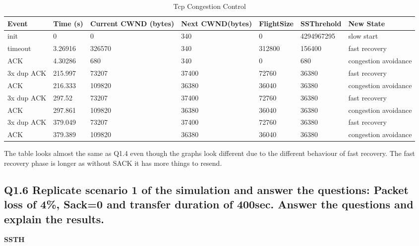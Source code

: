 \documentclass{article}
\begin{document}
\begin{table}[h]
\begin{tabular}{|l|l|l|l|l|l|l|}
\hline
Event           & Time (s)  & Current CWND (bytes) & Next CWND(bytes) & FlightSize & SSThrehold & New State  \\ \hline
init	& 0	        & 0             & 340	        & 0	        & 4294967295    & slow start \\ \hline
timeout	& 3.26916	& 326570	& 340	        & 312800        & 156400	& fast recovery \\ \hline
ACK	& 4.30286	& 680	        & 340	        & 0	        & 680	        & congestion avoidance \\ \hline
3x dup ACK	& 215.997	& 73207	        & 37400	        & 72760	        & 36380	        & fast recovery \\ \hline
ACK	& 216.333	& 109820	& 36380	        & 36040         & 36380	        & congestion avoidance \\ \hline
3x dup ACK& 297.52	& 73207	        & 37400	        & 72760	        & 36380         & fast recovery \\ \hline
ACK	& 297.861	& 109820	& 36380	        & 36040         & 36380	        & congestion avoidance \\ \hline
3x dup ACK	& 379.049	& 73207	        & 37400	        & 72760         & 36380	        & fast recovery \\ \hline
ACK	& 379.389	& 109820	& 36380	        & 36040         & 36380	        & congestion avoidance \\ \hline
\end{tabular}
\caption{Tcp Congestion Control}
\label{tab:scenario1}
\end{table}

The table looks almost the same as Q1.4 even though the graphs look different due to the different behaviour of fast recovery. The fast recovery phase is longer as without SACK it has more things to resend. 


\subsection{Q1.6 Replicate scenario 1 of the simulation and answer the questions: \textbf{Packet loss of 4\%, Sack=0 and transfer duration of 400sec}. Answer the questions and explain the results.
}

\textbf{SSTH}
\end{document}
